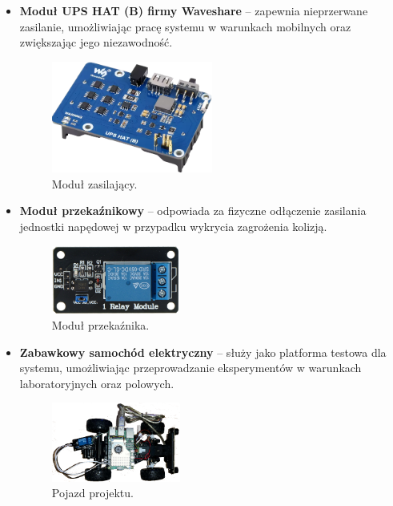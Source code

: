 \documentclass[magisterska]{pracadypl}
\begin{document}
\begin{itemize}
  \item \textbf{Moduł UPS HAT (B) firmy Waveshare} – zapewnia nieprzerwane zasilanie, umożliwiając pracę systemu w warunkach mobilnych oraz zwiększając jego niezawodność.
    \begin{figure}[H]  %
      \centering  %
      \includegraphics[width=0.5\textwidth]{images/upsfront.png}  %
      \captionsetup{font=footnotesize}
      \caption[Moduł zasilający. https://www.waveshare.com/wiki/UPS-HAT-(B)]{Moduł zasilający.}
    \end{figure}

  \item \textbf{Moduł przekaźnikowy} – odpowiada za fizyczne odłączenie zasilania jednostki napędowej w przypadku wykrycia zagrożenia kolizją.

    \begin{figure}[H]  %
      \centering  %
      \includegraphics[width=0.4\textwidth]{images/relay.png}  %
      \captionsetup{font=footnotesize}
      \caption[Moduł przekaźnika. https://l1nq.com/hQOm9]{Moduł przekaźnika.}
    \end{figure}

  \item \textbf{Zabawkowy samochód elektryczny} – służy jako platforma testowa dla systemu, umożliwiając przeprowadzanie eksperymentów w warunkach laboratoryjnych oraz polowych.
    \begin{figure}[H]  %
      \centering  %
      \includegraphics[width=0.4\textwidth]{images/auto.png}  %
      \captionsetup{font=footnotesize}
      \caption[Pojazd projektu. Opracowanie własne]{Pojazd projektu.}
    \end{figure}


\end{itemize}
\end{document}
